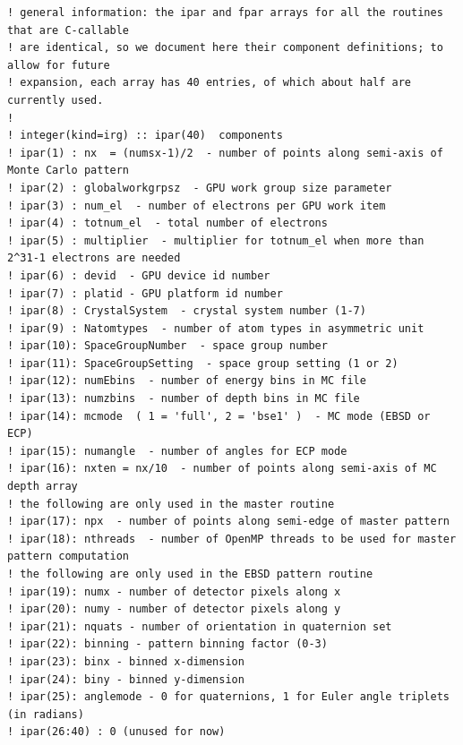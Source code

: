 \documentclass[DIV=calc, paper=letter, fontsize=11pt]{scrartcl}	 %
\begin{document}
{\footnotesize\begin{verbatim}
! general information: the ipar and fpar arrays for all the routines that are C-callable
! are identical, so we document here their component definitions; to allow for future 
! expansion, each array has 40 entries, of which about half are currently used.
!
! integer(kind=irg) :: ipar(40)  components 
! ipar(1) : nx  = (numsx-1)/2  - number of points along semi-axis of Monte Carlo pattern
! ipar(2) : globalworkgrpsz  - GPU work group size parameter
! ipar(3) : num_el  - number of electrons per GPU work item
! ipar(4) : totnum_el  - total number of electrons
! ipar(5) : multiplier  - multiplier for totnum_el when more than 2^31-1 electrons are needed
! ipar(6) : devid  - GPU device id number
! ipar(7) : platid - GPU platform id number
! ipar(8) : CrystalSystem  - crystal system number (1-7)
! ipar(9) : Natomtypes  - number of atom types in asymmetric unit
! ipar(10): SpaceGroupNumber  - space group number
! ipar(11): SpaceGroupSetting  - space group setting (1 or 2)
! ipar(12): numEbins  - number of energy bins in MC file
! ipar(13): numzbins  - number of depth bins in MC file
! ipar(14): mcmode  ( 1 = 'full', 2 = 'bse1' )  - MC mode (EBSD or ECP)
! ipar(15): numangle  - number of angles for ECP mode
! ipar(16): nxten = nx/10  - number of points along semi-axis of MC depth array
! the following are only used in the master routine
! ipar(17): npx  - number of points along semi-edge of master pattern
! ipar(18): nthreads  - number of OpenMP threads to be used for master pattern computation
! the following are only used in the EBSD pattern routine
! ipar(19): numx - number of detector pixels along x
! ipar(20): numy - number of detector pixels along y
! ipar(21): nquats - number of orientation in quaternion set
! ipar(22): binning - pattern binning factor (0-3)
! ipar(23): binx - binned x-dimension
! ipar(24): biny - binned y-dimension
! ipar(25): anglemode - 0 for quaternions, 1 for Euler angle triplets (in radians)
! ipar(26:40) : 0 (unused for now)



\end{verbatim}}
\end{document}
